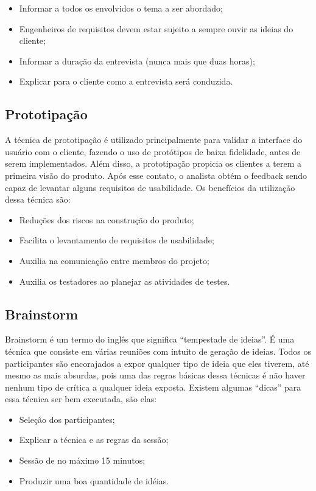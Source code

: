   \begin{itemize}
    \item{Informar a todos os envolvidos o tema a ser abordado;}
    \item{Engenheiros de requisitos devem estar sujeito a sempre ouvir as ideias do cliente;}
    \item{Informar a duração da entrevista (nunca mais que duas horas);}
    \item{Explicar para o cliente como a entrevista será conduzida.}
  \end{itemize}

\subsection{Prototipação}

  A técnica de prototipação é utilizado principalmente para validar a interface do usuário com o cliente, fazendo o uso de protótipos de
  baixa fidelidade, antes de serem implementados. Além disso, a prototipação propicia os clientes a terem a primeira visão do produto.
  Após esse contato, o analista obtém o feedback sendo capaz de levantar alguns requisitos de usabilidade. Os benefícios da utilização
  dessa técnica são:

  \begin{itemize}
    \item{Reduções dos riscos na construção do produto;}
    \item{Facilita o levantamento de requisitos de usabilidade;}
    \item{Auxilia na comunicação entre membros do projeto;}
    \item{Auxilia os testadores ao planejar as atividades de testes.}
  \end{itemize}

\subsection{Brainstorm}

  Brainstorm é um termo do inglês que significa “tempestade de ideias”. É uma técnica que consiste em várias reuniões com intuito de
  geração de ideias. Todos os participantes são encorajados a expor qualquer tipo de ideia que eles tiverem, até mesmo as mais absurdas,
  pois uma das regras básicas dessa técnicas é não haver nenhum tipo de crítica a qualquer ideia exposta. Existem algumas “dicas” para
  essa técnica ser bem executada, são elas:

  \begin{itemize}
    \item{Seleção dos participantes;}
    \item{Explicar a técnica e as regras da sessão;}
    \item{Sessão de no máximo 15 minutos;}
    \item{Produzir uma boa quantidade de idéias.}
  \end{itemize}

